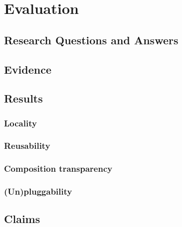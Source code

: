 
\chapter{Evaluation}\label{Evaluation}

\section{Research Questions and Answers}\label{Research Questions and Answers}

\section{Evidence}\label{Evidence}

\section{Results}\label{Results}

\subsection{Locality}
\subsection{Reusability}
\subsection{Composition transparency}
\subsection{(Un)pluggability}

\section{Claims}\label{Claims}

